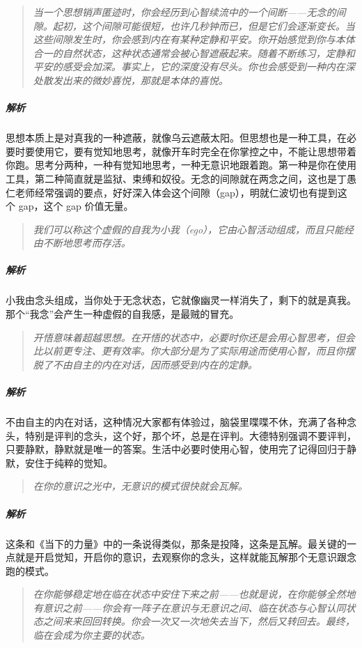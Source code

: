 \begin{quote}\it
    当一个思想销声匿迹时，你会经历到心智续流中的一个间断——无念的间隙。起初，这个间隙可能很短，也许几秒钟而已，但是它们会逐渐变长。当这些间隙发生时，你会感到内在有某种定静和平安。你开始感觉到你与本体合一的自然状态，这种状态通常会被心智遮蔽起来。随着不断练习，定静和平安的感受会加深。事实上，它的深度没有尽头。你也会感受到一种内在深处散发出来的微妙喜悦，那就是本体的喜悦。
\end{quote}

\subparagraph{解析} 思想本质上是对真我的一种遮蔽，就像乌云遮蔽太阳。但思想也是一种工具，在必要时要使用它，要有觉知地思考，就像开车时完全在你掌控之中，不能让思想带着你跑。思考分两种，一种有觉知地思考，一种无意识地跟着跑。第一种是你在使用工具，第二种简直就是监狱、束缚和奴役。无念的间隙就在两念之间，这也是丁愚仁老师经常强调的要点，好好深入体会这个间隙（gap），明就仁波切也有提到这个 gap，这个 gap 价值无量。

\begin{quote}\it
    我们可以称这个虚假的自我为小我（ego），它由心智活动组成，而且只能经由不断地思考而存活。
\end{quote}

\subparagraph{解析} 小我由念头组成，当你处于无念状态，它就像幽灵一样消失了，剩下的就是真我。那个“我念”会产生一种虚假的自我感，是最贼的冒充。

\begin{quote}\it
    开悟意味着超越思想。在开悟的状态中，必要时你还是会用心智思考，但会比以前更专注、更有效率。你大部分是为了实际用途而使用心智，而且你摆脱了不由自主的内在对话，因而感受到内在的定静。
\end{quote}

\subparagraph{解析} 不由自主的内在对话，这种情况大家都有体验过，脑袋里喋喋不休，充满了各种念头，特别是评判的念头，这个好，那个坏，总是在评判。大德特别强调不要评判，只要静默，静默就是唯一的答案。生活中必要时使用心智，使用完了记得回归于静默，安住于纯粹的觉知。

\begin{quote}\it
    在你的意识之光中，无意识的模式很快就会瓦解。
\end{quote}

\subparagraph{解析} 这条和《当下的力量》中的一条说得类似，那条是投降，这条是瓦解。最关键的一点就是开启觉知，开启你的意识，去观察你的念头，这样就能瓦解那个无意识跟念跑的模式。

\begin{quote}\it
    在你能够稳定地在临在状态中安住下来之前——也就是说，在你能够全然地有意识之前——你会有一阵子在意识与无意识之间、临在状态与心智认同状态之间来来回回转换。你会一次又一次地失去当下，然后又转回去。最终，临在会成为你主要的状态。
\end{quote}


